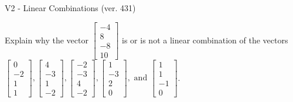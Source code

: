 \begin{exercise}
  \begin{exerciseTitle}V2 - Linear Combinations (ver. 431)\end{exerciseTitle}
  \begin{exerciseStatement}
    Explain why the vector \(\left[\begin{array}{c}
-4 \\
8 \\
-8 \\
10
\end{array}\right]\)  is or is not a linear 
	combination of the vectors \(\left[\begin{array}{c}
0 \\
-2 \\
1 \\
1
\end{array}\right] , \left[\begin{array}{c}
4 \\
-3 \\
1 \\
-2
\end{array}\right] , \left[\begin{array}{c}
-2 \\
-3 \\
4 \\
-2
\end{array}\right] , \left[\begin{array}{c}
1 \\
-3 \\
2 \\
0
\end{array}\right] , \text{ and } \left[\begin{array}{c}
1 \\
1 \\
-1 \\
0
\end{array}\right]\).
	



\end{exerciseStatement}
\end{exercise}
